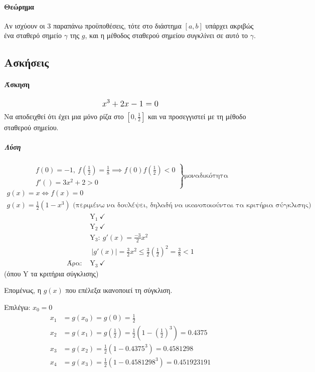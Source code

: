 \documentclass[11pt,a4paper,notitlepage,fleqn]{article}
\begin{document}
	\paragraph{Θεώρημα}
	Αν ισχύουν οι 3 παραπάνω προϋποθέσεις, τότε στο διάστημα
	\( [a,b] \) υπάρχει ακριβώς ένα σταθερό σημείο \(\gamma\)
	της \(g\), και η μέθοδος σταθερού σημείου συγκλίνει σε αυτό
	το \( \gamma \).
	
	\subsection{Ασκήσεις}
	\paragraph{Άσκηση}
	\[
	\mathlarger{x^3+2x-1=0}
	\]
	Να αποδειχθεί ότι έχει μια μόνο ρίζα στο \( \left[0,\frac{1}{2}\right] \) και
	να προσεγγιστεί με τη μέθοδο σταθερού σημείου.
	\subparagraph{Λύση}
	\[ \left.
	\begin{array}{l}
	f(0) = -1,\ f\left(\frac{1}{2}\right) = \frac{1}{8} \implies
	f(0)f\left(\frac{1}{2}\right) < 0 \\
	f'() = 3x^2 + 2 > 0
	\end{array} \right\rbrace \text{μοναδικότητα}
	\]
	\begin{gather*}
	g(x) = x \iff f(x) = 0 \\
	g(x) = \frac{1}{2} (1-x^3) \text{ (περιμένω να δουλέψει, δηλαδή να ικανοποιούνται
		τα κριτήρια σύγκλισης)}
	\end{gather*}
	\begin{align*}
		&\mathrm Y_1 \ \checkmark \\
		&\mathrm Y_2 \ \checkmark \\
		&\mathrm Y_3:\ g'(x) = \frac{-3}{2} x^2 \\
		&\ \left|g'(x)\right| = \frac{3}{2} x^2 \leq \frac{3}{2}\left(\frac{1}{2}\right)^2
		= \frac{3}{8} < 1 \\
		\text{Άρα: } & \mathrm Y_3 \ \checkmark
	\end{align*}
	(όπου \( \mathrm Y \) τα κριτήρια σύγκλισης)
	
	Επομένως, η \( g(x) \) που επέλεξα ικανοποιεί τη σύγκλιση.
	
	Επιλέγω: \( x_0 = 0 \)
	\begin{align*}
		x_1 &= g(x_0) = g(0) = \frac{1}{2} \\
		x_2 &= g(x_1) = g\left(\frac{1}{2}\right) = \frac{1}{2}\left(
		1-\left(\frac{1}{2}\right)^3
		\right) = 0.4375 \\
		x_3 &= g(x_2) = \frac{1}{2} \left(1 - 0.4375^3\right) = 0.4581298 \\
		x_4 &= g(x_3) = \frac{1}{2} \left(1-0.4581298^3\right) = 0.451923191
	\end{align*}
\end{document}

